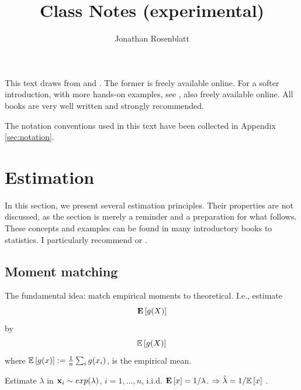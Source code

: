 






\author{Jonathan Rosenblatt}
\title{Class Notes (experimental)}






\maketitle

This text draws from \cite{hastie_elements_2003} and \cite{shalev-shwartz_understanding_2014}.
The former is freely available online.
For a softer introduction, with more hands-on examples, see \cite{james_introduction_2013}, also freely available online.
All books are very well written and strongly recommended.

The notation conventions used in this text have been collected in Appendix \ref{sec:notation}.


\tableofcontents

\newpage





\section{Estimation}
\label{sec:estimation} 
In this section, we present several estimation principles. 
Their properties are not discussed, as the section is merely a reminder and a preparation for what follows.
These concepts and examples can be found in many introductory books to statistics. I particularly recommend \cite{wasserman_all_2004} or \cite{abramovich_statistical_2013}.

\subsection{Moment matching}
\label{sec:moment_matching}

The fundamental idea: match empirical moments to theoretical. I.e., estimate
$$ \mathbf{E}\left[ g(X) \right]   $$
by 
$$ \mathbb{E}\left[g(X)\right]   $$
where $\mathbb{E}\left[g(x)\right]:=\frac{1}{n}  \sum_i g(x_i)$, is the empirical mean.

\begin{example}

Estimate $\lambda$ in $\mathbf{x}_i \sim exp(\lambda)$, $i=1,\dots,n$, i.i.d.
$\mathbf{E}\left[ x \right]=1/\lambda$.
$\Rightarrow \hat{\lambda}=1/\mathbb{E}\left[x\right]$ .

\end{example}


